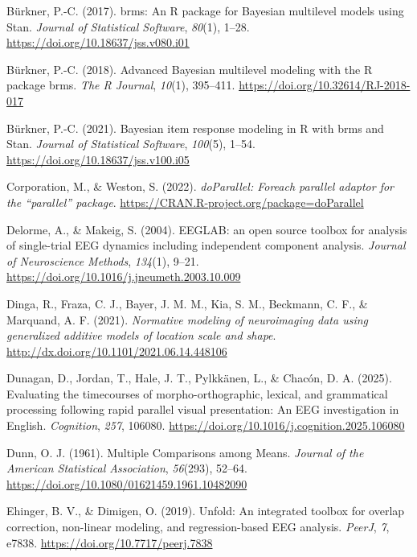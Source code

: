 \documentclass[
  doc,
  floatsintext,
  longtable,
  a4paper,
  nolmodern,
  notxfonts,
  notimes,
  colorlinks=true,linkcolor=blue,citecolor=blue,urlcolor=blue]{apa7}
\newlength{\cslhangindent}
\newenvironment{CSLReferences}[2] %
 {\begin{list}{}{%
  \setlength{\itemindent}{0pt}
  \setlength{\leftmargin}{0pt}
  \setlength{\parsep}{0pt}
  \ifodd #1
   \setlength{\leftmargin}{\cslhangindent}
   \setlength{\itemindent}{-1\cslhangindent}
  \fi
  \setlength{\itemsep}{#2\baselineskip}}}
 {\end{list}}
\begin{document}
\begin{CSLReferences}{1}{0}
Bürkner, P.-C. (2017). {brms}: An {R} package for {Bayesian} multilevel
models using {Stan}. \emph{Journal of Statistical Software},
\emph{80}(1), 1--28. \url{https://doi.org/10.18637/jss.v080.i01}

Bürkner, P.-C. (2018). Advanced {Bayesian} multilevel modeling with the
{R} package {brms}. \emph{The R Journal}, \emph{10}(1), 395--411.
\url{https://doi.org/10.32614/RJ-2018-017}

Bürkner, P.-C. (2021). Bayesian item response modeling in {R} with
{brms} and {Stan}. \emph{Journal of Statistical Software},
\emph{100}(5), 1--54. \url{https://doi.org/10.18637/jss.v100.i05}

Corporation, M., \& Weston, S. (2022). \emph{{doParallel}: Foreach
parallel adaptor for the {``{parallel}''} package}.
\url{https://CRAN.R-project.org/package=doParallel}

Delorme, A., \& Makeig, S. (2004). EEGLAB: an open source toolbox for
analysis of single-trial EEG dynamics including independent component
analysis. \emph{Journal of Neuroscience Methods}, \emph{134}(1), 9--21.
\url{https://doi.org/10.1016/j.jneumeth.2003.10.009}

Dinga, R., Fraza, C. J., Bayer, J. M. M., Kia, S. M., Beckmann, C. F.,
\& Marquand, A. F. (2021). \emph{Normative modeling of neuroimaging data
using generalized additive models of location scale and shape}.
\url{http://dx.doi.org/10.1101/2021.06.14.448106}

Dunagan, D., Jordan, T., Hale, J. T., Pylkkänen, L., \& Chacón, D. A.
(2025). Evaluating the timecourses of morpho-orthographic, lexical, and
grammatical processing following rapid parallel visual presentation: An
EEG investigation in English. \emph{Cognition}, \emph{257}, 106080.
\url{https://doi.org/10.1016/j.cognition.2025.106080}

Dunn, O. J. (1961). Multiple Comparisons among Means. \emph{Journal of
the American Statistical Association}, \emph{56}(293), 52--64.
\url{https://doi.org/10.1080/01621459.1961.10482090}

Ehinger, B. V., \& Dimigen, O. (2019). Unfold: An integrated toolbox for
overlap correction, non-linear modeling, and regression-based {EEG}
analysis. \emph{PeerJ}, \emph{7}, e7838.
\url{https://doi.org/10.7717/peerj.7838}


\end{CSLReferences}
\end{document}
